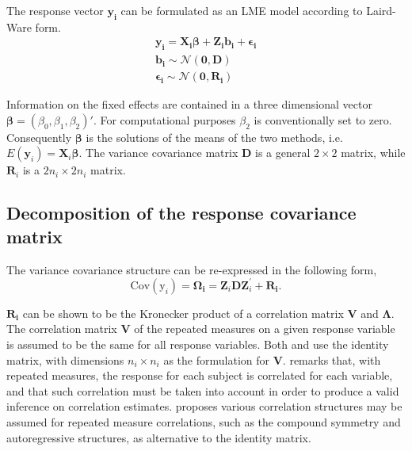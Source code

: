 \documentclass[MAIN.tex]{subfiles}
\begin{document}
	The response vector $\boldsymbol{y_{i}}$ can be formulated as an LME model according to Laird-Ware form.
	\begin{eqnarray*}
		\boldsymbol{y_{i}} = \boldsymbol{X_{i}\beta}  + \boldsymbol{Z_{i}b_{i}} + \boldsymbol{\epsilon_{i}}\\
		\boldsymbol{b_{i}} \sim \mathcal{N}(\boldsymbol{0,D})\\
		\boldsymbol{\epsilon_{i}} \sim \mathcal{N}(\boldsymbol{0,R_{i}})
	\end{eqnarray*}
	
	Information on the fixed effects are contained in a three dimensional vector $\boldsymbol{\beta} = (\beta_{0},\beta_{1},\beta_{2})\prime$. For computational purposes $\beta_{2}$ is conventionally set to zero. Consequently $\boldsymbol{\beta}$ is the solutions of the means of the two methods, i.e. $E(\boldsymbol{y}_{i})  = \boldsymbol{X}_{i}\boldsymbol{\beta}$. The variance covariance matrix $\boldsymbol{D}$ is a general $2 \times 2$ matrix, while $\boldsymbol{R}_{i}$ is a $2n_{i} \times 2n_{i}$ matrix.
	
	\subsection{Decomposition of the response covariance matrix}
	
	The variance covariance structure can be re-expressed in the following form,
	\[
	\mbox{Cov}(\mbox{y}_{i}) = \boldsymbol{\Omega_{i}} = \boldsymbol{Z}_{i}\boldsymbol{D}\boldsymbol{Z}_{i}^\prime + \boldsymbol{R_{i}}.
	\]
	
	$\boldsymbol{R_{i}}$ can be shown to be the Kronecker product of a correlation matrix $\boldsymbol{V}$ and $\boldsymbol{\Lambda}$. The correlation matrix $\boldsymbol{V}$ of the repeated measures on a given response variable is assumed to be the same for all response variables. Both \citet{hamlett} and \citet{lam} use the identity matrix, with dimensions $n_{i} \times n_{i}$ as the formulation for $\boldsymbol{V}$. \citet{roy} remarks that, with repeated measures, the response for each subject is correlated for each variable, and that such correlation must be taken into account in order to produce a valid inference on correlation estimates.  \citet{roy2006} proposes various correlation structures may be assumed for repeated measure correlations, such as the compound symmetry and autoregressive structures, as alternative to the identity matrix.
	
\end{document}
